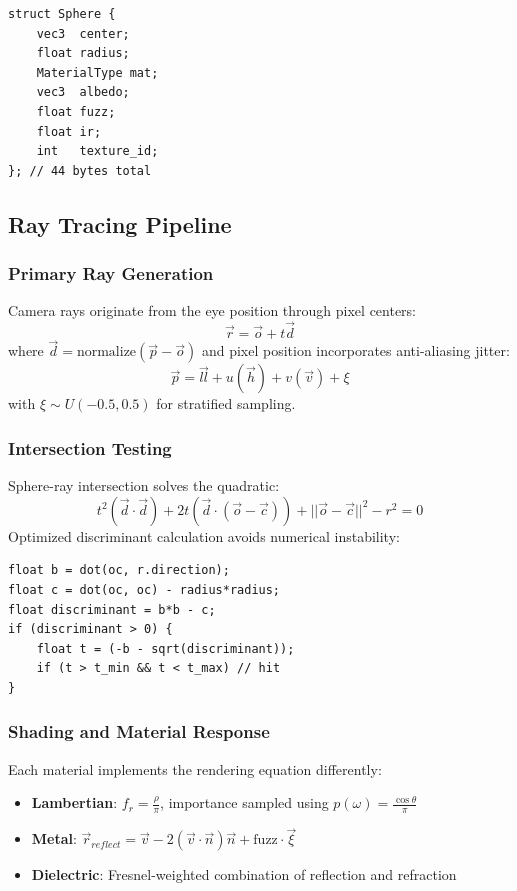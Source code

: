 \documentclass[conference]{IEEEtran}
\begin{document}
\begin{lstlisting}
struct Sphere {
    vec3  center;
    float radius;
    MaterialType mat;
    vec3  albedo;
    float fuzz;
    float ir;
    int   texture_id;
}; // 44 bytes total
\end{lstlisting}

\subsection{Ray Tracing Pipeline}

\subsubsection{Primary Ray Generation}
Camera rays originate from the eye position through pixel centers:
\begin{equation}
\vec{r} = \vec{o} + t\vec{d}
\end{equation}
where $\vec{d} = \text{normalize}(\vec{p} - \vec{o})$ and pixel position incorporates anti-aliasing jitter:
\begin{equation}
\vec{p} = \vec{ll} + u(\vec{h}) + v(\vec{v}) + \xi
\end{equation}
with $\xi \sim U(-0.5, 0.5)$ for stratified sampling.

\subsubsection{Intersection Testing}
Sphere-ray intersection solves the quadratic:
\begin{equation}
t^2(\vec{d} \cdot \vec{d}) + 2t(\vec{d} \cdot (\vec{o}-\vec{c})) + ||\vec{o}-\vec{c}||^2 - r^2 = 0
\end{equation}
Optimized discriminant calculation avoids numerical instability:
\begin{lstlisting}
float b = dot(oc, r.direction);
float c = dot(oc, oc) - radius*radius;
float discriminant = b*b - c;
if (discriminant > 0) {
    float t = (-b - sqrt(discriminant));
    if (t > t_min && t < t_max) // hit
}
\end{lstlisting}

\subsubsection{Shading and Material Response}
Each material implements the rendering equation differently:
\begin{itemize}
    \item \textbf{Lambertian}: $f_r = \frac{\rho}{\pi}$, importance sampled using $p(\omega) = \frac{\cos\theta}{\pi}$
    \item \textbf{Metal}: $\vec{r}_{reflect} = \vec{v} - 2(\vec{v} \cdot \vec{n})\vec{n} + \text{fuzz} \cdot \vec{\xi}$
    \item \textbf{Dielectric}: Fresnel-weighted combination of reflection and refraction
\end{itemize}
\end{document}
